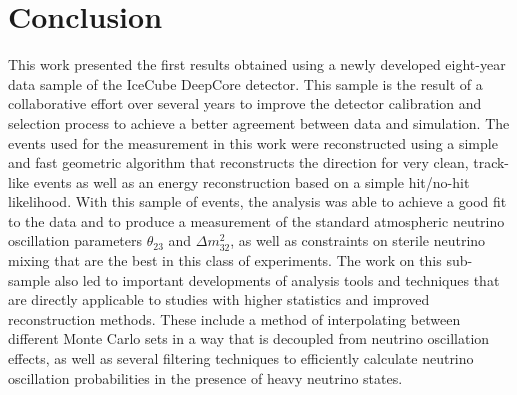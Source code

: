 \chapter{Conclusion}

This work presented the first results obtained using a newly developed eight-year data sample of the IceCube DeepCore detector. This sample is the result of a collaborative effort over several years to improve the detector calibration and selection process to achieve a better agreement between data and simulation. The events used for the measurement in this work were reconstructed using a simple and fast geometric algorithm that reconstructs the direction for very clean, track-like events as well as an energy reconstruction based on a simple hit/no-hit likelihood. With this  sample of events, the analysis was able to achieve a good fit to the data and to produce a measurement of the standard atmospheric neutrino oscillation parameters $\theta_{23}$ and $\Delta m^2_{32}$, as well as constraints on sterile neutrino mixing that are the best in this class of experiments. The work on this sub-sample also led to important developments of analysis tools and techniques that are directly applicable to studies with higher statistics and improved reconstruction methods. These include a method of interpolating between different Monte Carlo sets in a way that is decoupled from neutrino oscillation effects, as well as several filtering techniques to efficiently calculate neutrino oscillation probabilities in the presence of heavy neutrino states.


